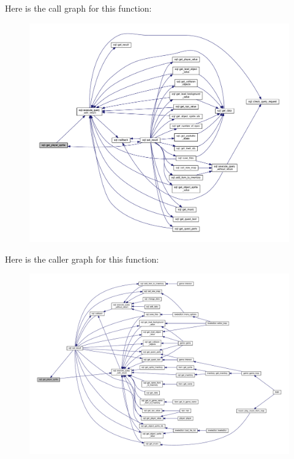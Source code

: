 Here is the call graph for this function\+:
\nopagebreak
\begin{figure}[H]
\begin{center}
\leavevmode
\includegraphics[width=350pt]{classsql_a370d018617316ff6489cbb97565b7af9_cgraph}
\end{center}
\end{figure}
Here is the caller graph for this function\+:
\nopagebreak
\begin{figure}[H]
\begin{center}
\leavevmode
\includegraphics[width=350pt]{classsql_a370d018617316ff6489cbb97565b7af9_icgraph}
\end{center}
\end{figure}
\mbox{\label{classsql_ae560c01f2e8e57cee454ecd8e38616eb}} 
